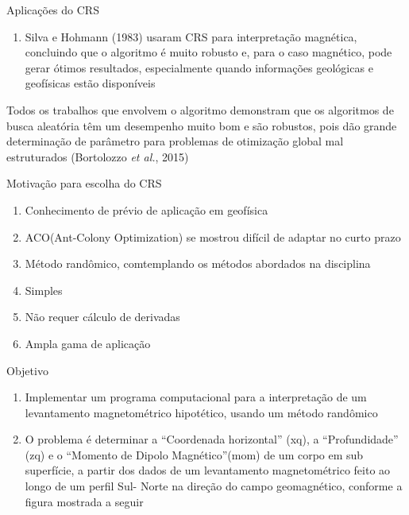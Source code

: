 \documentclass{beamer}
\begin{document}
\begin{frame}{Aplicações do CRS}
\begin{enumerate}
\item Silva e Hohmann (1983) usaram CRS para interpretação magnética, concluindo que o algoritmo é muito robusto e, para o caso magnético, pode gerar ótimos resultados, especialmente quando informações geológicas e geofísicas estão disponíveis
\end{enumerate}
Todos os trabalhos que envolvem o algoritmo demonstram que os algoritmos de busca aleatória têm um desempenho muito bom e são robustos, pois dão grande determinação de parâmetro para problemas de otimização global mal estruturados (Bortolozzo \emph{et al.}, 2015)
\end{frame}

\begin{frame}{Motivação para escolha do CRS}
\begin{enumerate}
\item Conhecimento de prévio de aplicação em geofísica
\item ACO(Ant-Colony Optimization) se mostrou difícil de adaptar no curto prazo
\item Método randômico, comtemplando os métodos abordados na disciplina
\item Simples
\item Não requer cálculo de derivadas
\item Ampla gama de aplicação
\end{enumerate}
\end{frame}

\begin{frame}{Objetivo}
\begin{enumerate}
\item Implementar um programa computacional para a interpretação de um levantamento magnetométrico hipotético, usando um método randômico
\item O problema é determinar a “Coordenada horizontal” (xq), a “Profundidade” (zq) e o “Momento de Dipolo Magnético”(mom) de um corpo em sub superfície, a partir dos dados de um levantamento magnetométrico feito ao longo de um perfil Sul- Norte na direção do campo geomagnético, conforme a figura mostrada a seguir
\end{enumerate}
\end{frame}
\end{document}

